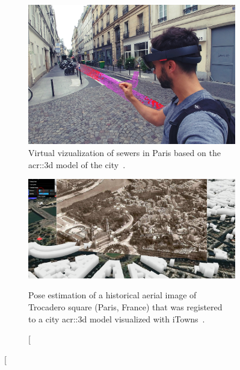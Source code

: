             \begin{figure}[htpb]
                \begin{subfigure}{.48\textwidth}
                    \begin{center}
                        \includegraphics[width=\textwidth]{images/introduction/3d_model_applications/insitu_sewer_hololens}
                        \caption{\label{subfig::augemented_reality} Virtual vizualization of sewers in Paris based on the \gls{acr::3d} model of the city~\parencite{devaux20183d}.}
                    \end{center}
                \end{subfigure}
                \hfill
                \begin{subfigure}{.48\textwidth}
                    \begin{center}
                        \includegraphics[width=\textwidth]{images/introduction/3d_model_applications/trocadero_historical}
                        \caption[
                            Pose estimation of a historical aerial image of Trocadero square (Paris, France) that was registered~\parencite{harrach2019interactive} to a city \gls{acr::3d} model visualized with iTowns~\parencite{devaux2012web}.

\end{center}
\end{subfigure}
\end{figure}

